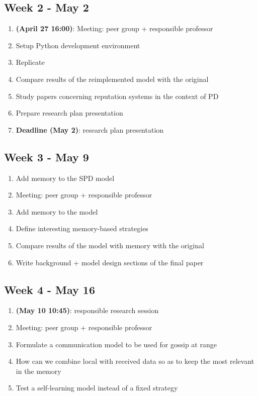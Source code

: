 \documentclass[english]{article}
\begin{document}
\subsection*{Week 2 - May 2}
\begin{enumerate}
\item \textbf{(April 27 16:00)}: Meeting: peer group + responsible professor
\item Setup Python development environment
\item Replicate \citet{smaldino}
\item Compare results of the reimplemented model with the original
\item Study papers concerning reputation systems in the context of PD \citep{simple-reputation,public-private-monitoring}
\item Prepare research plan presentation
\item \textbf{Deadline (May 2)}: research plan presentation
\end{enumerate}

\subsection*{Week 3 - May 9}
\begin{enumerate}
\item Add memory to the SPD model
\item Meeting: peer group + responsible professor
\item Add memory to the model
\item Define interesting memory-based strategies
\item Compare results of the model with memory with the original
\item Write background + model design sections of the final paper
\end{enumerate}

\subsection*{Week 4 - May 16}
\begin{enumerate}
\item \textbf{(May 10 10:45)}: responsible research session
\item Meeting: peer group + responsible professor
\item Formulate a communication model to be used for gossip at range
\item How can we combine local with received data so as to keep the most relevant in the memory
\item Test a self-learning model instead of a fixed strategy
\end{enumerate}
\end{document}
